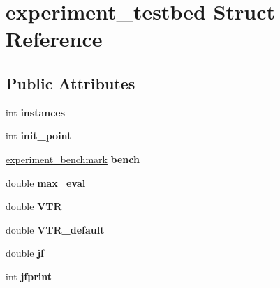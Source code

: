\hypertarget{structexperiment__testbed}{\section{experiment\-\_\-testbed Struct Reference}
\label{structexperiment__testbed}
}
\subsection*{Public Attributes}
\begin{DoxyCompactItemize}
\item 
\hypertarget{structexperiment__testbed_aa40ec329a95aafe4e3e453161dbd7764}{int {\bfseries instances}}\label{structexperiment__testbed_aa40ec329a95aafe4e3e453161dbd7764}

\item 
\hypertarget{structexperiment__testbed_ac4b1532f8be60f757d128c8dba755a67}{int {\bfseries init\-\_\-point}}\label{structexperiment__testbed_ac4b1532f8be60f757d128c8dba755a67}

\item 
\hypertarget{structexperiment__testbed_a6d847f8fa9e10a11d5d0204ba20a63d5}{\hyperlink{structexperiment__benchmark}{experiment\-\_\-benchmark} {\bfseries bench}}\label{structexperiment__testbed_a6d847f8fa9e10a11d5d0204ba20a63d5}

\item 
\hypertarget{structexperiment__testbed_afdd8632424f601f56c08cf628569de5a}{double {\bfseries max\-\_\-eval}}\label{structexperiment__testbed_afdd8632424f601f56c08cf628569de5a}

\item 
\hypertarget{structexperiment__testbed_aa64028a1e35eb2a0062e19c70ecd7950}{double {\bfseries V\-T\-R}}\label{structexperiment__testbed_aa64028a1e35eb2a0062e19c70ecd7950}

\item 
\hypertarget{structexperiment__testbed_ab5bbb0b86ea91a92ba7368d13ffa0810}{double {\bfseries V\-T\-R\-\_\-default}}\label{structexperiment__testbed_ab5bbb0b86ea91a92ba7368d13ffa0810}

\item 
\hypertarget{structexperiment__testbed_a260f0d526019e1ce2c0fec1bb0e45ae0}{double {\bfseries jf}}\label{structexperiment__testbed_a260f0d526019e1ce2c0fec1bb0e45ae0}

\item 
\hypertarget{structexperiment__testbed_a0278e28d209d5e0e33bcf55ccdb83c62}{int {\bfseries jfprint}}\label{structexperiment__testbed_a0278e28d209d5e0e33bcf55ccdb83c62}


\end{DoxyCompactItemize}
